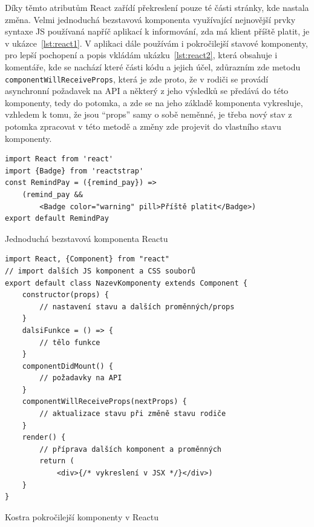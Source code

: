     Díky těmto atributům React zařídí překreslení pouze té části stránky, kde nastala změna. Velmi jednoduchá bezstavová komponenta využívající nejnovější prvky syntaxe JS používaná napříč aplikací k informování, zda má klient příště platit, je v ukázce~\ref{lst:react1}. V aplikaci dále používám i pokročilejší stavové komponenty, pro lepší pochopení a popis vkládám ukázku~\ref{lst:react2}, která obsahuje i komentáře, kde se nachází které části kódu a jejich účel, zdůrazním zde metodu \verb|componentWillReceiveProps|, která je zde proto, že v rodiči se provádí asynchronní požadavek na API a některý z jeho výsledků se předává do této komponenty, tedy do potomka, a zde se na jeho základě komponenta vykresluje, vzhledem k tomu, že jsou \enquote{props} samy o sobě neměnné, je třeba nový stav z potomka zpracovat v této metodě a změny zde projevit do vlastního stavu komponenty. 
    
    \begin{listing}
    	\begin{verbatim}
import React from 'react'
import {Badge} from 'reactstrap'
const RemindPay = ({remind_pay}) =>
    (remind_pay && 
        <Badge color="warning" pill>Příště platit</Badge>)
export default RemindPay
    	\end{verbatim}
    	\caption{Jednoduchá bezstavová komponenta Reactu}\label{lst:react1}
    \end{listing}
    
    \begin{listing}[ht]
    	\begin{verbatim}
import React, {Component} from "react"
// import dalších JS komponent a CSS souborů
export default class NazevKomponenty extends Component {
    constructor(props) {
        // nastavení stavu a dalších proměnných/props
    }
    dalsiFunkce = () => {
        // tělo funkce
    }
    componentDidMount() {
        // požadavky na API
    }
    componentWillReceiveProps(nextProps) {
        // aktualizace stavu při změně stavu rodiče
    }
    render() {
        // příprava dalších komponent a proměnných
        return (
            <div>{/* vykreslení v JSX */}</div>)
    }
}
    	\end{verbatim}
    	\caption{Kostra pokročilejší komponenty v Reactu}\label{lst:react2}
    \end{listing}
    
